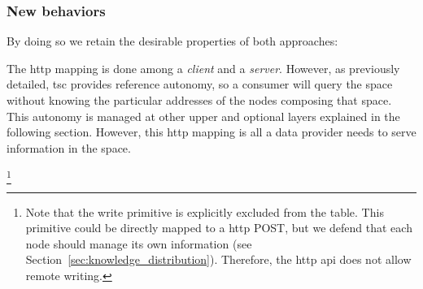 
\subsubsection{New behaviors}







%
%

By doing so we retain the desirable properties of both approaches:




















The \acs{http} mapping is done among a \textit{client} and a \textit{server}.
However, as previously detailed, \ac{tsc} provides reference autonomy, so a consumer will query the space without knowing the particular addresses of the nodes composing that space.
This autonomy is managed at other upper and optional layers explained in the following section.
However, this \acs{http} mapping is all a data provider needs to serve information in the space.


\footnote{
  Note that the write primitive is explicitly excluded from the table.
  This primitive could be directly mapped to a \acs{http} POST,
  but we defend that each node should manage its own information
  (see Section~\ref{sec:knowledge_distribution}).
  Therefore, the \acs{http} \acs{api} does not allow remote writing.
}